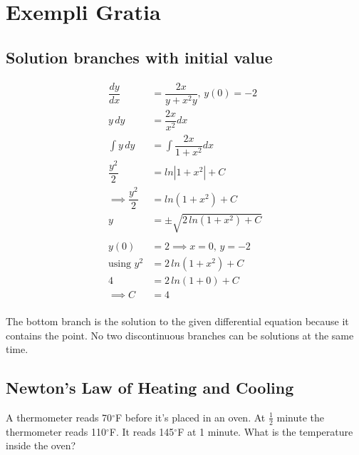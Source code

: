 \documentclass{article}
\begin{document}
\section{Exempli Gratia}

\subsection{Solution branches with initial value}

\begin{align*}
	\dfrac{dy}{dx}&=\dfrac{2x}{y+x^2y},\,y(0)=-2\\
	y\,dy&=\dfrac{2x}{x^2}dx\\
	\int y\,dy&=\int\dfrac{2x}{1+x^2}dx\\
	\dfrac{y^2}{2}&=ln|1+x^2|+C\\
	\implies\dfrac{y^2}{2}&=ln(1+x^2)+C\\
	y&=\pm\sqrt{2\,ln(1+x^2)+C}\\\\
	y(0)&=2\implies x=0,\,y=-2\\
	\text{using }y^2&=2\,ln(1+x^2)+C\\
	4&=2\,ln(1+0)+C\\
	\implies C&=4\\
\end{align*}
\begin{center}
\end{center}
The bottom branch is the solution to the given differential equation because it contains the point. No two discontinuous branches can be solutions at the same time.

\subsection{Newton's Law of Heating and Cooling}

A thermometer reads 70$^{\circ}$F before it's placed in an oven. At $\frac{1}{2}$ minute the thermometer reads 110$^{\circ}$F. It reads 145$^{\circ}$F at 1 minute. What is the temperature inside the oven?\\
\end{document}
